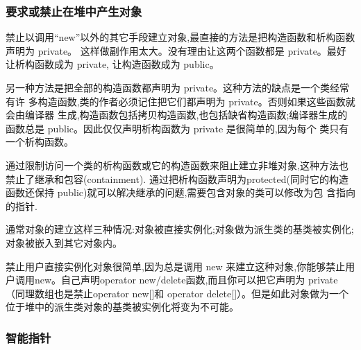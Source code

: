 \subsubsection{要求或禁止在堆中产生对象}
\begindot
\item[要求在堆中建立对象]
禁止以调用“new”以外的其它手段建立对象,最直接的方法是把构造函数和析构函数声明为 private。 这样做副作用太大。没有理由让这两个函数都是 private。最好让析构函数成为 private, 让构造函数成为 public。

另一种方法是把全部的构造函数都声明为 private。这种方法的缺点是一个类经常有许 多构造函数,类的作者必须记住把它们都声明为 private。否则如果这些函数就会由编译器 生成,构造函数包括拷贝构造函数,也包括缺省构造函数;编译器生成的函数总是 public。因此仅仅声明析构函数为 private 是很简单的,因为每个 类只有一个析构函数。

通过限制访问一个类的析构函数或它的构造函数来阻止建立非堆对象,这种方法也禁止了继承和包容(containment). 通过把析构函数声明为protected(同时它的构造函数还保持 public)就可以解决继承的问题,需要包含对象的类可以修改为包
含指向的指针.
\item[禁止堆对象]通常对象的建立这样三种情况:对象被直接实例化;对象做为派生类的基类被实例化; 对象被嵌入到其它对象内。

禁止用户直接实例化对象很简单,因为总是调用 new 来建立这种对象,你能够禁止用户调用new。自己声明operator new/delete函数,而且你可以把它声明为 private（同理数组也是禁止operator new[]和 operator delete[]）。但是如此对象做为一个位于堆中的派生类对象的基类被实例化将变为不可能。

\myenddot

\subsubsection{智能指针}

